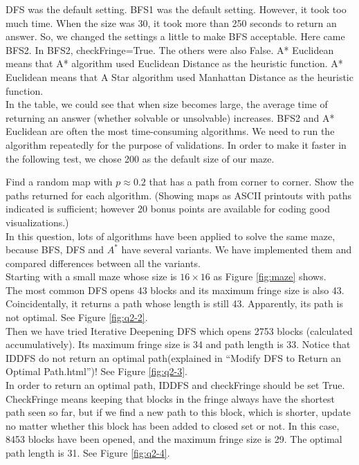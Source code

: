 \documentclass[letter]{article}
\begin{document}
\begin{questions}
	DFS was the default setting. BFS1 was the default setting. However, it took too much time. When the size was 30, it took more than 250 seconds to return an answer. So, we changed the settings a little to make BFS acceptable. Here came BFS2. In BFS2, checkFringe=True. The others were also False. A* Euclidean means that A* algorithm used Euclidean Distance as the heuristic function. A* Euclidean means that A Star algorithm used Manhattan Distance as the heuristic function. \\
	
	In the table, we could see that when size becomes large, the average time of returning an answer (whether solvable or unsolvable) increases. BFS2 and A* Euclidean are often the most time-consuming algorithms. We need to run the algorithm repeatedly for the purpose of validations. In order to make it faster in the following test, we chose 200 as the default size of our maze. \\
	
	\item {Find a random map with $ p \approx 0.2 $ that has a path from corner to corner. Show the paths returned for each algorithm. (Showing maps as ASCII printouts with paths indicated is sufficient; however 20 bonus points are available for coding good visualizations.)} \\
	
	In this question, lots of algorithms have been applied to solve the same maze, because BFS, DFS and $ A^* $ have several variants. We have implemented them and compared differences between all the variants. \\
	
	Starting with a small maze whose size is $ 16 \times 16 $ as Figure \ref{fig:maze} shows. \\
	
	The most common DFS opens 43 blocks and its maximum fringe size is also 43. Coincidentally, it returns a path whose length is still 43. Apparently, its path is not optimal. See Figure \ref{fig:q2-2}. \\
	
	Then we have tried Iterative Deepening DFS which opens 2753 blocks (calculated accumulatively). Its maximum fringe size is 34 and path length is 33. Notice that IDDFS do not return an optimal path(explained in “Modify DFS to Return an Optimal Path.html”)! See Figure \ref{fig:q2-3}. \\
	
	In order to return an optimal path, IDDFS and checkFringe should be set True. CheckFringe means keeping that blocks in the fringe always have the shortest path seen so far, but if we find a new path to this block, which is shorter, update no matter whether this block has been added to closed set or not. In this case, 8453 blocks have been opened, and the maximum fringe size is 29. The optimal path length is 31. See Figure \ref{fig:q2-4}.\\
	

\end{questions}
\end{document}
